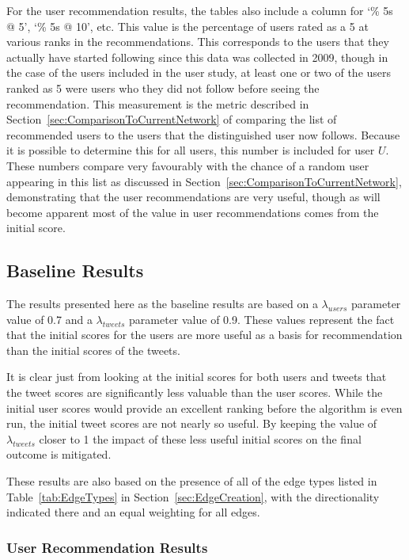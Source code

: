 For the user recommendation results, the tables also include a column for `\% 5s @ 5', `\% 5s @ 10', etc. This value is the percentage of users rated as a 5 at various ranks in the recommendations. This corresponds to the users that they actually have started following since this data was collected in 2009, though in the case of the users included in the user study, at least one or two of the users ranked as 5 were users who they did not follow before seeing the recommendation. This measurement is the metric described in Section~\ref{sec:ComparisonToCurrentNetwork} of comparing the list of recommended users to the users that the distinguished user now follows. Because it is possible to determine this for all users, this number is included for user $U$. These numbers compare very favourably with the chance of a random user appearing in this list as discussed in Section~\ref{sec:ComparisonToCurrentNetwork}, demonstrating that the user recommendations are very useful, though as will become apparent most of the value in user recommendations comes from the initial score.


\subsection{Baseline Results}
\label{sec:BaselineResults}

The results presented here as the baseline results are based on a $\lambda_{users}$ parameter value of 0.7 and a $\lambda_{tweets}$ parameter value of 0.9. These values represent the fact that the initial scores for the users are more useful as a basis for recommendation than the initial scores of the tweets.

It is clear just from looking at the initial scores for both users and tweets that the tweet scores are significantly less valuable than the user scores. While the initial user scores would provide an excellent ranking before the algorithm is even run, the initial tweet scores are not nearly so useful. By keeping the value of $\lambda_{tweets}$ closer to 1 the impact of these less useful initial scores on the final outcome is mitigated.

These results are also based on the presence of all of the edge types listed in Table~\ref{tab:EdgeTypes} in Section~\ref{sec:EdgeCreation}, with the directionality indicated there and an equal weighting for all edges.


\subsubsection{User Recommendation Results}

